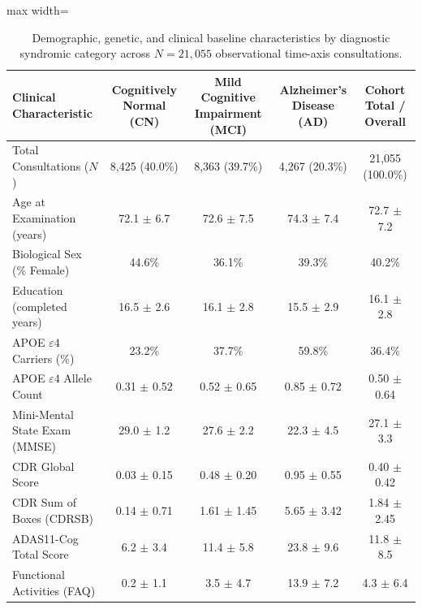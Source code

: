 \begin{table}[t]
\centering
\caption{Demographic, genetic, and clinical baseline characteristics by diagnostic syndromic category across $N = 21,055$ observational time-axis consultations.}
\label{tab:baseline_characteristics}
\small
\begin{adjustbox}{max width=\linewidth}
\begin{tabular}{lcccc}
\toprule
\textbf{Clinical Characteristic} & \textbf{Cognitively Normal (CN)} & \textbf{Mild Cognitive Impairment (MCI)} & \textbf{Alzheimer's Disease (AD)} & \textbf{Cohort Total / Overall} \\
\midrule
Total Consultations ($N$)         & 8,425 (40.0\%)                   & 8,363 (39.7\%)                           & 4,267 (20.3\%)                    & 21,055 (100.0\%) \\
Age at Examination (years)        & 72.1 $\pm$ 6.7                   & 72.6 $\pm$ 7.5                           & 74.3 $\pm$ 7.4                    & 72.7 $\pm$ 7.2 \\
Biological Sex (\% Female)        & 44.6\%                           & 36.1\%                                   & 39.3\%                            & 40.2\% \\
Education (completed years)       & 16.5 $\pm$ 2.6                   & 16.1 $\pm$ 2.8                           & 15.5 $\pm$ 2.9                    & 16.1 $\pm$ 2.8 \\
APOE $\varepsilon4$ Carriers (\%) & 23.2\%                           & 37.7\%                                   & 59.8\%                            & 36.4\% \\
APOE $\varepsilon4$ Allele Count  & 0.31 $\pm$ 0.52                  & 0.52 $\pm$ 0.65                          & 0.85 $\pm$ 0.72                   & 0.50 $\pm$ 0.64 \\
Mini-Mental State Exam (MMSE)     & 29.0 $\pm$ 1.2                   & 27.6 $\pm$ 2.2                           & 22.3 $\pm$ 4.5                    & 27.1 $\pm$ 3.3 \\
CDR Global Score                  & 0.03 $\pm$ 0.15                  & 0.48 $\pm$ 0.20                          & 0.95 $\pm$ 0.55                   & 0.40 $\pm$ 0.42 \\
CDR Sum of Boxes (CDRSB)          & 0.14 $\pm$ 0.71                  & 1.61 $\pm$ 1.45                          & 5.65 $\pm$ 3.42                   & 1.84 $\pm$ 2.45 \\
ADAS11-Cog Total Score            & 6.2 $\pm$ 3.4                    & 11.4 $\pm$ 5.8                           & 23.8 $\pm$ 9.6                    & 11.8 $\pm$ 8.5 \\
Functional Activities (FAQ)       & 0.2 $\pm$ 1.1                    & 3.5 $\pm$ 4.7                            & 13.9 $\pm$ 7.2                    & 4.3 $\pm$ 6.4 \\
\bottomrule
\end{tabular}
\end{adjustbox}
\end{table}
